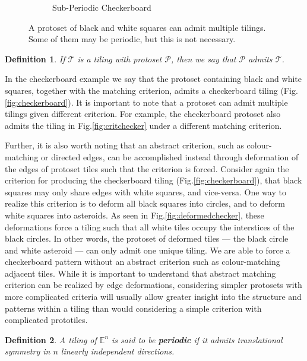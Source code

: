 \documentclass[
  oneside,
  11pt, a4paper,
  footinclude=true,
  headinclude=true,
  cleardoublepage=empty
]{scrbook}
\newtheorem{mydef}{Definition}
\begin{document}
\begin{figure}[H]
\begin{subfigure}[t]{0.45\textwidth}
    \caption{Sub-Periodic Checkerboard}
    \label{fig:aperiodicchecker}
\end{subfigure} 
\hspace*{\fill}
\label{fig:checker}
\caption[Checkerboard Tilings]{A protoset of black and white squares can admit multiple tilings. Some of them may be periodic, but this is not necessary.}
\end{figure}

\begin{mydef}
If $\mathcal{T}$ is a tiling with protoset $\mathcal{P}$, then we say that $\mathcal{P}$ admits $\mathcal{T}$.
\end{mydef}

In the checkerboard example we say that the protoset containing black and white squares, together with the matching criterion, admits a checkerboard tiling (Fig.\ref{fig:checkerboard}). It is important to note that a protoset can admit multiple tilings given different criterion. For example, the checkerboard protoset also admits the tiling in Fig.\ref{fig:critchecker} under a different matching criterion. 

Further, it is also worth noting that an abstract criterion, such as colour-matching or directed edges, can be accomplished instead through deformation of the edges of protoset tiles such that the criterion is forced. Consider again the criterion for producing the checkerboard tiling (Fig.\ref{fig:checkerboard}), that black squares may only share edges with white squares, and vice-versa. One way to realize this criterion is to deform all black squares into circles, and to deform white squares into asteroids. As seen in Fig.\ref{fig:deformedchecker}, these deformations force a tiling such that all white tiles occupy the interstices of the black circles. In other words, the protoset of deformed tiles --- the black circle and white asteroid --- can only admit one unique tiling. We are able to force a checkerboard pattern without an abstract criterion such as colour-matching adjacent tiles. While it is important to understand that abstract matching criterion can be realized by edge deformations, considering simpler protosets with more complicated criteria will usually allow greater insight into the structure and patterns within a tiling than would considering a simple criterion with complicated prototiles. 

\begin{mydef}
A tiling of  $\mathbb{E}^n$ is said to be \textbf{periodic} if it admits translational symmetry in $n$ linearly independent directions.
\end{mydef}
\end{document}
